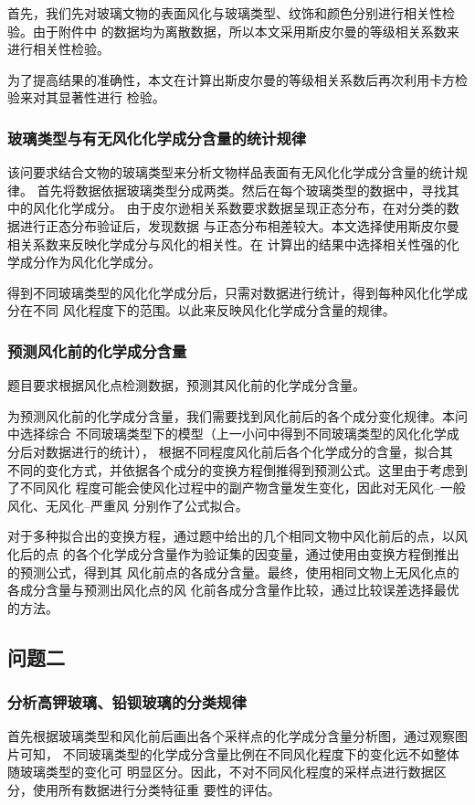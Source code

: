 \documentclass[withoutpreface,bwprint]{cumcmthesis} %
\begin{document}
首先，我们先对玻璃文物的表面风化与玻璃类型、纹饰和颜色分别进行相关性检验。由于附件中
的数据均为离散数据，所以本文采用斯皮尔曼的等级相关系数来进行相关性检验。

为了提高结果的准确性，本文在计算出斯皮尔曼的等级相关系数后再次利用卡方检验来对其显著性进行
检验。

\subsubsection{玻璃类型与有无风化化学成分含量的统计规律}%
该问要求结合文物的玻璃类型来分析文物样品表面有无风化化学成分含量的统计规律。
首先将数据依据玻璃类型分成两类。然后在每个玻璃类型的数据中，寻找其中的风化化学成分。
由于皮尔逊相关系数要求数据呈现正态分布，在对分类的数据进行正态分布验证后，发现数据
与正态分布相差较大。本文选择使用斯皮尔曼相关系数来反映化学成分与风化的相关性。在
计算出的结果中选择相关性强的化学成分作为风化化学成分。

得到不同玻璃类型的风化化学成分后，只需对数据进行统计，得到每种风化化学成分在不同
风化程度下的范围。以此来反映风化化学成分含量的规律。

\subsubsection{预测风化前的化学成分含量}%
题目要求根据风化点检测数据，预测其风化前的化学成分含量。

为预测风化前的化学成分含量，我们需要找到风化前后的各个成分变化规律。本问中选择综合
不同玻璃类型下的模型（上一小问中得到不同玻璃类型的风化化学成分后对数据进行的统计），
根据不同程度风化前后各个化学成分的含量，拟合其
不同的变化方式，并依据各个成分的变换方程倒推得到预测公式。这里由于考虑到了不同风化
程度可能会使风化过程中的副产物含量发生变化，因此对无风化--一般风化、无风化--严重风
分别作了公式拟合。

对于多种拟合出的变换方程，通过题中给出的几个相同文物中风化前后的点，以风化后的点
的各个化学成分含量作为验证集的因变量，通过使用由变换方程倒推出的预测公式，得到其
风化前点的各成分含量。最终，使用相同文物上无风化点的各成分含量与预测出风化点的风
化前各成分含量作比较，通过比较误差选择最优的方法。

\subsection{问题二}
\subsubsection{分析高钾玻璃、铅钡玻璃的分类规律}%
首先根据玻璃类型和风化前后画出各个采样点的化学成分含量分析图，通过观察图片可知，
不同玻璃类型的化学成分含量比例在不同风化程度下的变化远不如整体随玻璃类型的变化可
明显区分。因此，不对不同风化程度的采样点进行数据区分，使用所有数据进行分类特征重
要性的评估。
\end{document}
